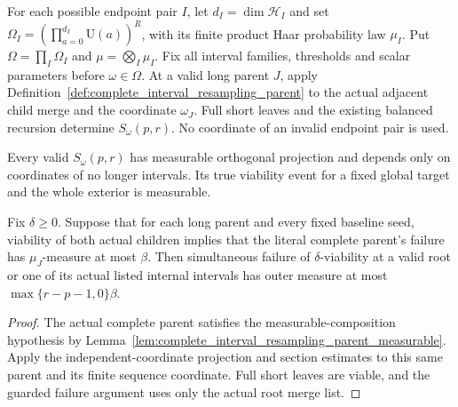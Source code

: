 \begin{definition}
    \label{def:interval_resampling_choices}
    \leanok
    For each possible endpoint pair $I$, let $d_I=\dim\mathcal H_I$ and
    set $\Omega_I=(\prod_{a=0}^{d_I}\mathrm U(a))^R$, with its finite
    product Haar probability law $\mu_I$. Put
    $\Omega=\prod_I\Omega_I$ and $\mu=\bigotimes_I\mu_I$.
    Fix all interval families, thresholds and scalar parameters before
    $\omega\in\Omega$. At a valid long parent $J$, apply
    Definition~\ref{def:complete_interval_resampling_parent} to the actual
    adjacent child merge and the coordinate $\omega_J$.
    Full short leaves and the existing balanced recursion determine
    $S_\omega(p,r)$. No coordinate of an invalid endpoint pair is used.
\end{definition}

\begin{lemma}
    \label{lem:actual_interval_resampling_tree_probability}
    \leanok
    Every valid $S_\omega(p,r)$ has measurable orthogonal projection and
    depends only on coordinates of no longer intervals. Its true viability
    event for a fixed global target and the whole exterior is measurable.

    Fix $\delta\ge0$. Suppose that for each long parent and every fixed
    baseline seed, viability of both actual children implies that the
    literal complete parent's failure has $\mu_J$-measure at most $\beta$.
    Then simultaneous failure of $\delta$-viability at a valid root or one
    of its actual listed internal intervals has outer measure at most
    $\max\{r-p-1,0\}\beta$.
\end{lemma}
\begin{proof}\leanok
    The actual complete parent satisfies the measurable-composition
    hypothesis by
    Lemma~\ref{lem:complete_interval_resampling_parent_measurable}.
    Apply the independent-coordinate projection and section estimates to
    this same parent and its finite sequence coordinate. Full short
    leaves are viable, and the guarded failure argument uses only the
    actual root merge list.
\end{proof}

